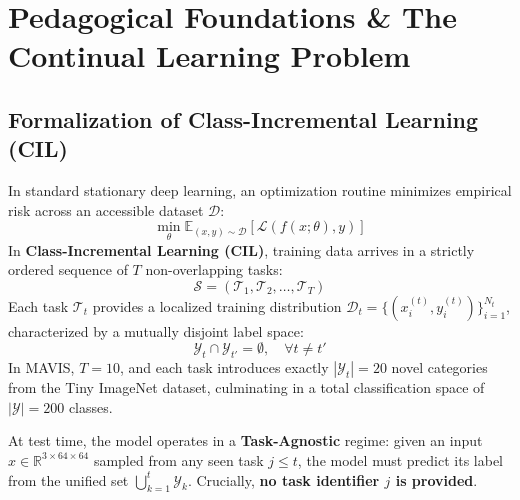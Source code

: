 \documentclass[11pt,a4paper]{article}
\begin{document}
\section{Pedagogical Foundations \& The Continual Learning Problem}
\label{sec:foundations}

\subsection{Formalization of Class-Incremental Learning (CIL)}
In standard stationary deep learning, an optimization routine minimizes empirical risk across an accessible dataset $\mathcal{D}$:
\begin{equation}
\min_{\theta} \mathbb{E}_{(x, y) \sim \mathcal{D}} [\mathcal{L}(f(x; \theta), y)]
\end{equation}
In \textbf{Class-Incremental Learning (CIL)}, training data arrives in a strictly ordered sequence of $T$ non-overlapping tasks:
\begin{equation}
\mathcal{S} = (\mathcal{T}_1, \mathcal{T}_2, \dots, \mathcal{T}_T)
\end{equation}
Each task $\mathcal{T}_t$ provides a localized training distribution $\mathcal{D}_t = \{(x_i^{(t)}, y_i^{(t)})\}_{i=1}^{N_t}$, characterized by a mutually disjoint label space:
\begin{equation}
\mathcal{Y}_t \cap \mathcal{Y}_{t'} = \emptyset, \quad \forall t \neq t'
\end{equation}
In MAVIS, $T = 10$, and each task introduces exactly $|\mathcal{Y}_t| = 20$ novel categories from the Tiny ImageNet dataset, culminating in a total classification space of $|\mathcal{Y}| = 200$ classes.

At test time, the model operates in a \textbf{Task-Agnostic} regime: given an input $x \in \mathbb{R}^{3 \times 64 \times 64}$ sampled from any seen task $j \le t$, the model must predict its label from the unified set $\bigcup_{k=1}^t \mathcal{Y}_k$. Crucially, \textbf{no task identifier $j$ is provided}.
\end{document}
